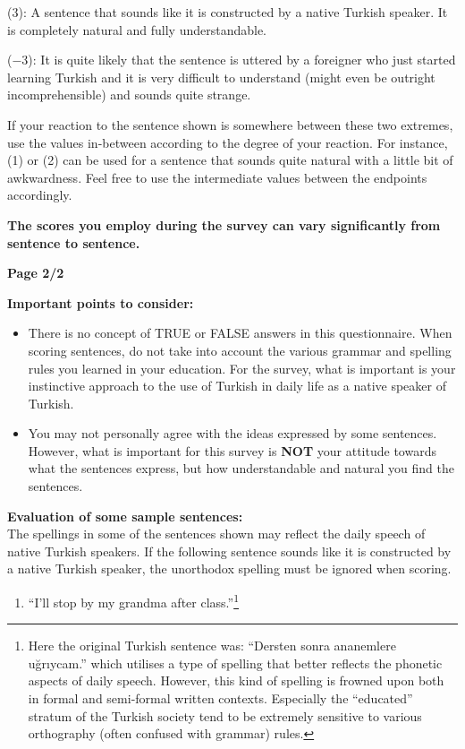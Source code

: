 (3): A sentence that sounds like it is constructed by a native Turkish speaker. It is completely natural and fully understandable. 

($-$3): It is quite likely that the sentence is uttered by a foreigner who just started learning Turkish and it is very difficult to understand (might even be outright incomprehensible) and sounds quite strange.

If your reaction to the sentence shown is somewhere between these two extremes, use the values in-between according to the degree of your reaction. For instance, (1) or (2) can be
used for a sentence that sounds quite natural with a little bit of awkwardness. Feel free to use the intermediate values between the endpoints accordingly.

\textbf{The scores you employ during the survey can vary significantly from sentence to sentence.}

\begin{center}
	\large \textbf{Page 2/2}
\end{center}

\textbf{Important points to consider:}
\begin{itemize}
	\item There is no concept of TRUE or FALSE answers in this questionnaire. When scoring sentences, do not take into account the various grammar and spelling rules you learned in your education. For the survey, what is important is your instinctive approach to the use of Turkish in daily life as a native speaker of Turkish.
	
	\item You may not personally agree with the ideas expressed by some sentences. However, what is important for this survey is \textbf{NOT} your attitude towards what the
	sentences express, but how understandable and natural you find the sentences. 
\end{itemize}


\textbf{Evaluation of some sample sentences:}\\
The spellings in some of the sentences shown may reflect the daily speech of native Turkish speakers. If the following sentence sounds like it is constructed by a native Turkish speaker, the unorthodox spelling must be ignored when scoring.

\begin{enumerate}
	
	\item ``I'll stop by my grandma after class.''\footnote{Here the original Turkish sentence was: ``Dersten sonra ananemlere uğrıycam.'' which utilises a type of spelling that better reflects the phonetic aspects of daily speech. However, this kind of spelling is frowned upon both in formal and semi-formal written contexts. Especially the ``educated'' stratum of the Turkish society tend to be extremely sensitive to various orthography (often confused with grammar) rules.}
\end{enumerate}


